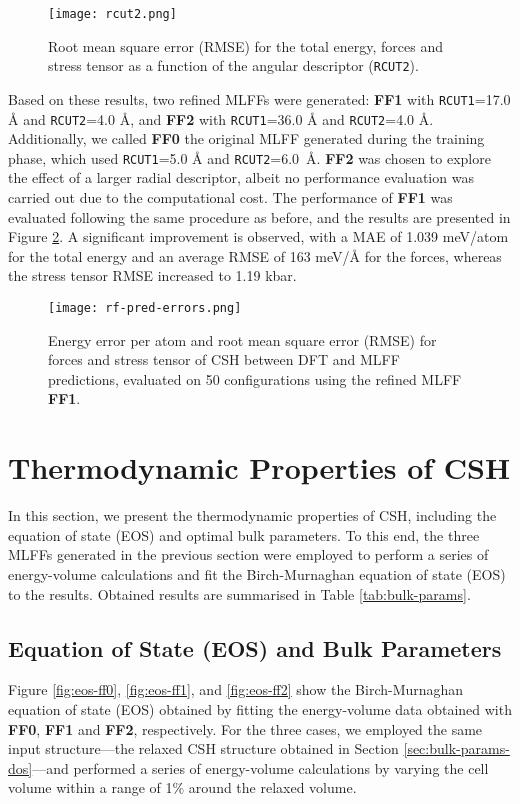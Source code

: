 \begin{figure}[h]
    \centering
    \texttt{[image: rcut2.png]}
    \caption{
    Root mean square error (RMSE) for the total energy, forces and stress tensor as a function of the angular descriptor (\texttt{RCUT2}).
    }
    \label{rcut2}
\end{figure}

Based on these results, two refined MLFFs were generated: \textbf{FF1} with \texttt{RCUT1}=17.0 Å and \texttt{RCUT2}=4.0 Å, and \textbf{FF2} with \texttt{RCUT1}=36.0 Å and \texttt{RCUT2}=4.0 Å. Additionally, we called \textbf{FF0} the original MLFF generated during the training phase, which used \texttt{RCUT1}=5.0 Å and \texttt{RCUT2}=6.0~Å. \textbf{FF2} was chosen to explore the effect of a larger radial descriptor, albeit no performance evaluation was carried out due to the computational cost. 
The performance of \textbf{FF1} was evaluated following the same procedure as before, and the results are presented in Figure \ref{rf-pred-errors}. A significant improvement is observed, with a MAE of  1.039 meV/atom for the total energy and an average RMSE of 163 meV/Å for the forces, whereas the stress tensor RMSE increased to 1.19 kbar.
\begin{figure}[h]
    \centering
    \texttt{[image: rf-pred-errors.png]}
    \caption{
    Energy error per atom and root mean square error (RMSE) for forces and stress tensor of CSH between DFT and MLFF predictions, evaluated on 50 configurations using the refined MLFF \textbf{FF1}.  
    }
    \label{rf-pred-errors}
\end{figure}
\section{Thermodynamic Properties of CSH}
\label{sec:thermo-properties}
In this section, we present the thermodynamic properties of CSH, including the equation of state (EOS) and optimal bulk parameters. To this end, the three MLFFs generated in the previous section were employed to perform a series of energy-volume calculations and fit the Birch-Murnaghan equation of state (EOS) to the results. Obtained results are summarised in Table \ref{tab:bulk-params}.

\subsection{Equation of State (EOS) and Bulk Parameters}
Figure \ref{fig:eos-ff0}, \ref{fig:eos-ff1}, and \ref{fig:eos-ff2} show the Birch-Murnaghan equation of state (EOS) obtained by fitting the energy-volume data obtained with \textbf{FF0}, \textbf{FF1} and \textbf{FF2}, respectively.  For the three cases, we employed the same input structure---the relaxed CSH structure obtained in Section \ref{sec:bulk-params-dos}---and performed a series of energy-volume calculations by varying the cell volume within a range of 1\% around the relaxed volume. 


